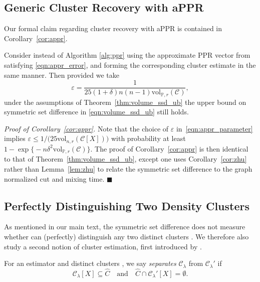 \documentclass[twoside,11pt]{article}
\newcommand{\1}{\mathbf{1}}
\newcommand{\mc}[1]{\mathcal{#1}}
\newcommand{\Pbb}{\mathbb{P}}
\newcommand{\wh}[1]{\widehat{#1}}
\newcommand{\vol}{\mathrm{vol}}
\newcommand{\qed}{\hfill $\blacksquare$}
\begin{document}
\subsection{Generic Cluster Recovery with aPPR}
\label{subsec:appr_volume_ssd_ub}
Our formal claim regarding cluster recovery with aPPR is contained in Corollary~\ref{cor:appr}.
\begin{corollary}
	\label{cor:appr}
	Consider instead of
	Algorithm \ref{alg:ppr} using the approximate PPR vector from
	\citet{andersen2006} satisfying \eqref{eqn:appr_error}, and forming the 
	corresponding cluster estimate \smash{$\wh{C}$} in the same manner.  Then 
	provided we take 
	\begin{equation}
	\label{eqn:appr_parameter}
	\varepsilon = \frac{1}{25(1 + \delta)n(n - 1)\vol_{\Pbb,r}(\mc{C})} ,
	\end{equation}
	under the assumptions of Theorem~\ref{thm:volume_ssd_ub} the upper bound on symmetric set difference in \eqref{eqn:volume_ssd_ub} still
	holds.
\end{corollary}	
\emph{Proof of Corollary~\ref{cor:appr}.}
Note that the choice of $\varepsilon$ in~\eqref{eqn:appr_parameter} implies $\varepsilon \leq 1/\bigl(25\vol_{n,r}(\mc{C}[X])\bigr)$ with probability at least $1 - \exp\bigl\{-n\delta^2\vol_{\Pbb,r}(\mc{C})\bigr\}$. The proof of Corollary~\ref{cor:appr} is then identical to that of Theorem~\ref{thm:volume_ssd_ub}, except one uses Corollary~\ref{cor:zhu} rather than Lemma~\ref{lem:zhu} to relate the symmetric set difference to the graph normalized cut and mixing time. \qed 

\subsection{Perfectly Distinguishing Two Density Clusters}
\label{subsec:consistent_recovery_density_clusters}

As mentioned in our main text, the symmetric set difference does not measure whether \smash{$\wh{C}$}
can (perfectly) distinguish any two distinct clusters \smash{$\mc{C}_{\lambda},\mc{C}_{\lambda}' \in 
	\mathbb{C}_f(\lambda)$}. We therefore also study a second notion of cluster 
estimation, first introduced by \citet{hartigan1981}.

\begin{definition}
	\label{def:density_cluster_consistency}
	For an estimator \smash{$\wh{C} \subseteq X$} and distinct clusters \smash{$\mc{C}_{\lambda}, \mc{C}_{\lambda}' \in \mathbb{C}_f(\lambda)$}, we say \smash{$\wh{C}$} \emph{separates} $\mc{C}_{\lambda}$ from $\mc{C}_{\lambda}'$ if 
	\begin{equation}
	\label{eqn:density_cluster_consistency}
	\mc{C}_{\lambda}[X] \subseteq \wh{C} \quad \text{and} \quad
	\wh{C} \cap \mc{C}_{\lambda}'[X] = \emptyset.
	\end{equation}
\end{definition}
\end{document}
